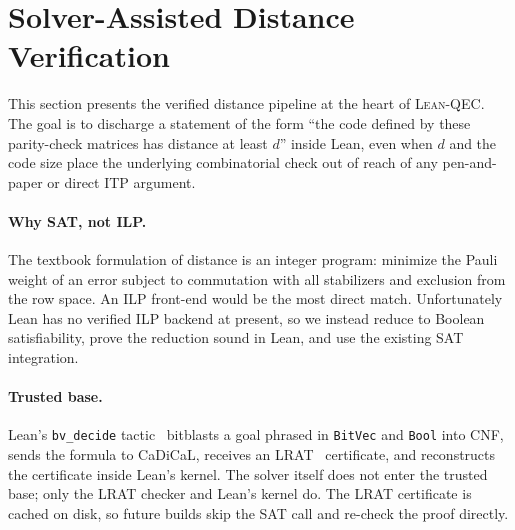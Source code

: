 \section{Solver-Assisted Distance Verification}
\label{sec:smt}

%
%

This section presents the verified distance pipeline at the heart of
\textsc{Lean-QEC}. The goal is to discharge a statement of the form ``the code
defined by these parity-check matrices has distance at least $d$'' inside Lean,
even when $d$ and the code size place the underlying combinatorial check out of
reach of any pen-and-paper or direct ITP argument.

\paragraph{Why SAT, not ILP.} The textbook formulation of distance is an integer
program: minimize the Pauli weight of an error subject to commutation with all
stabilizers and exclusion from the row space. An ILP front-end would be the most
direct match. Unfortunately Lean has no verified ILP backend at present, so we
instead reduce to Boolean satisfiability, prove the reduction sound in Lean, and
use the existing SAT integration.

\paragraph{Trusted base.} Lean's \lstinline{bv_decide}
tactic~\cite{biere2024cadical} bitblasts a goal phrased in \lstinline{BitVec}
and \lstinline{Bool} into CNF, sends the formula to CaDiCaL, receives an
LRAT~\cite{lrat} certificate, and reconstructs the certificate inside Lean's
kernel. The solver itself does not enter the trusted base; only the LRAT checker
and Lean's kernel do. The LRAT certificate is cached on disk, so future builds
skip the SAT call and re-check the proof directly.

